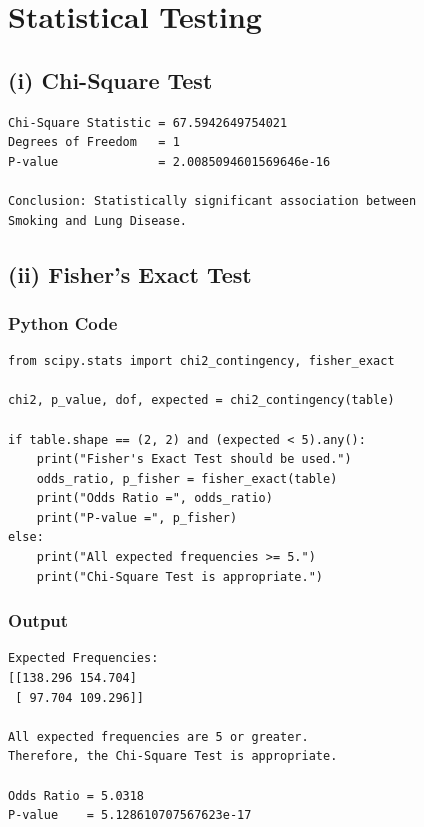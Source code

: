 \documentclass[12pt,a4paper]{article}
\begin{document}
\section{Statistical Testing}

\subsection{(i) Chi-Square Test}

\begin{lstlisting}[style=outputstyle]
Chi-Square Statistic = 67.5942649754021
Degrees of Freedom   = 1
P-value              = 2.0085094601569646e-16

Conclusion: Statistically significant association between
Smoking and Lung Disease.
\end{lstlisting}

\subsection{(ii) Fisher's Exact Test}

\subsubsection{Python Code}

\begin{lstlisting}[style=pythonstyle, caption={Chi-Square vs Fisher decision}]
from scipy.stats import chi2_contingency, fisher_exact

chi2, p_value, dof, expected = chi2_contingency(table)

if table.shape == (2, 2) and (expected < 5).any():
    print("Fisher's Exact Test should be used.")
    odds_ratio, p_fisher = fisher_exact(table)
    print("Odds Ratio =", odds_ratio)
    print("P-value =", p_fisher)
else:
    print("All expected frequencies >= 5.")
    print("Chi-Square Test is appropriate.")
\end{lstlisting}

\subsubsection{Output}

\begin{lstlisting}[style=outputstyle]
Expected Frequencies:
[[138.296 154.704]
 [ 97.704 109.296]]

All expected frequencies are 5 or greater.
Therefore, the Chi-Square Test is appropriate.

Odds Ratio = 5.0318
P-value    = 5.128610707567623e-17
\end{lstlisting}
\end{document}
